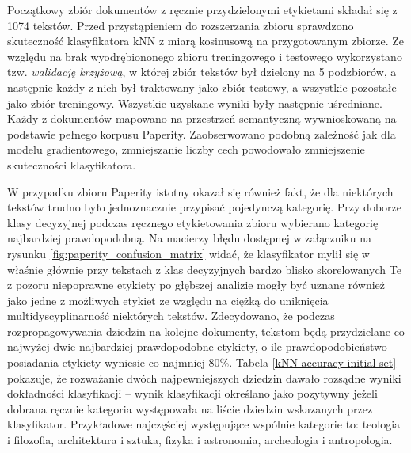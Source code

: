 \documentclass{pracamgr}
\begin{document}
Początkowy zbiór dokumentów z ręcznie przydzielonymi etykietami składał się z 1074 tekstów. Przed przystąpieniem do rozszerzania zbioru sprawdzono skuteczność klasyfikatora kNN z miarą kosinusową na przygotowanym zbiorze. Ze względu na brak wyodrębiononego zbioru treningowego i testowego wykorzystano tzw. \textit{walidację krzyżową}, w której zbiór tekstów był dzielony na 5 podzbiorów, a następnie każdy z nich był traktowany jako zbiór testowy, a wszystkie pozostałe jako zbiór treningowy. Wszystkie uzyskane wyniki były następnie uśredniane. Każdy z dokumentów mapowano na przestrzeń semantyczną wywnioskowaną na podstawie pełnego korpusu Paperity. Zaobserwowano podobną zależność jak dla modelu gradientowego, zmniejszanie liczby cech powodowało zmniejszenie skuteczności klasyfikatora. 

W przypadku zbioru Paperity istotny okazał się również fakt, że dla niektórych tekstów trudno było jednoznacznie przypisać pojedynczą kategorię. Przy doborze klasy decyzyjnej podczas ręcznego etykietowania zbioru wybierano kategorię najbardziej prawdopodobną. Na macierzy błędu dostępnej w załączniku na rysunku \ref{fig:paperity_confusion_matrix} widać, że klasyfikator mylił się w właśnie głównie przy tekstach z klas decyzyjnych bardzo blisko skorelowanych Te z pozoru niepoprawne etykiety po głębszej analizie mogły być uznane również jako jedne z możliwych etykiet ze względu na ciężką do uniknięcia multidyscyplinarność niektórych tekstów. Zdecydowano, że podczas rozpropagowywania dziedzin na kolejne dokumenty, tekstom będą przydzielane co najwyżej dwie najbardziej prawdopodobne etykiety, o ile prawdopodobieństwo posiadania etykiety wyniesie co najmniej 80\%. Tabela \ref{kNN-accuracy-initial-set} pokazuje, że rozważanie dwóch najpewniejszych dziedzin dawało rozsądne wyniki dokładności klasyfikacji -- wynik klasyfikacji określano jako pozytywny jeżeli dobrana ręcznie kategoria występowała na liście dziedzin wskazanych przez klasyfikator. Przykładowe najczęściej występujące wspólnie kategorie to: teologia i filozofia, architektura i sztuka, fizyka i astronomia, archeologia i antropologia. 
\end{document}
